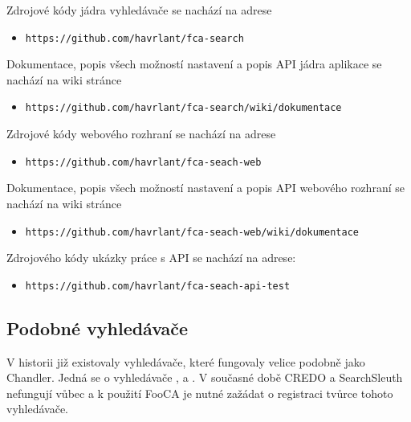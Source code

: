 \documentclass[12pt]{article}
\newcommand{\name}{Chandler}
\newcommand{\code}[1]{\texttt{#1}}
\newcommand{\ssection}[1]{\subsection{#1}}
\begin{document}
Zdrojové kódy jádra vyhledávače se nachází na adrese
\begin{itemize}
	\item \code{https://github.com/havrlant/fca-search}
\end{itemize}
Dokumentace, popis všech možností nastavení a popis API jádra aplikace se nachází na wiki stránce
\begin{itemize}
	\item \code{https://github.com/havrlant/fca-search/wiki/dokumentace}
\end{itemize}
Zdrojové kódy webového rozhraní se nachází na adrese
\begin{itemize}
	\item \code{https://github.com/havrlant/fca-seach-web}
\end{itemize}
Dokumentace, popis všech možností nastavení a popis API webového rozhraní se nachází na wiki stránce
\begin{itemize}
	\item \code{https://github.com/havrlant/fca-seach-web/wiki/dokumentace}
\end{itemize}
Zdrojového kódy ukázky práce s API se nachází na adrese:
\begin{itemize}
	\item \code{https://github.com/havrlant/fca-seach-api-test}
\end{itemize}

\ssection{Podobné vyhledávače}\label{ch.fcaengines}
V historii již existovaly vyhledávače, které fungovaly velice podobně jako \name. Jedná se o vyhledávače ,  a . V současné době CREDO a SearchSleuth nefungují vůbec a k použití FooCA je nutné zažádat o registraci tvůrce tohoto vyhledávače. 
\end{document}
